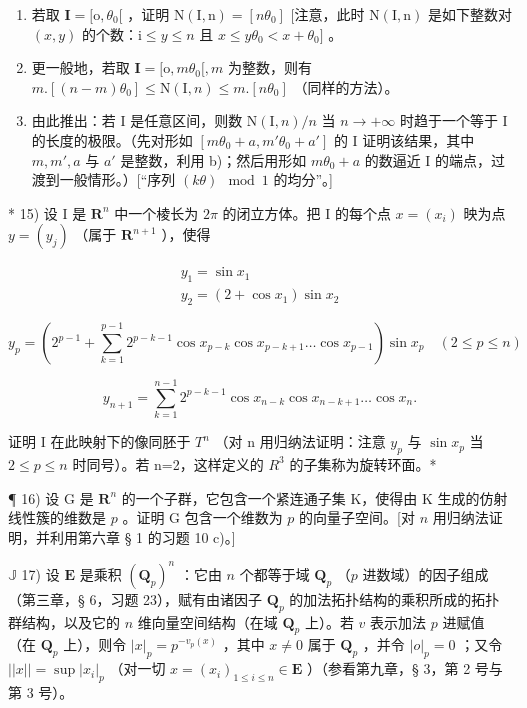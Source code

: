 \begin{enumerate}
\def\labelenumi{\alph{enumi})}
\item
  若取 \(\mathbf{I} = [\mathrm{o},\theta_0[\) ，证明 \(\mathrm{N(I,n)} = [n\theta_0]\) {[}注意，此时 \(\mathrm{N(I,n)}\) 是如下整数对 \((x,y)\) 的个数：\(\mathrm{i}\leqslant y\leqslant n\) 且 \(x\leqslant y\theta_0 < x + \theta_0]\) 。
\item
  更一般地，若取 \(\mathbf{I} = [\mathrm{o}, m\theta_0[, m\) 为整数，则有 \(m. [(n - m)\theta_0] \leqslant \mathrm{N}(\mathrm{I}, n) \leqslant m. [n\theta_0]\) （同样的方法）。
\item
  由此推出：若 I 是任意区间，则数 \(\mathrm{N}(\mathrm{I}, n)/n\) 当 \(n \to +\infty\) 时趋于一个等于 I 的长度的极限。（先对形如 \([m\theta_{0} + a, m'\theta_{0} + a']\) 的 I 证明该结果，其中 \(m, m', a\) 与 \(a'\) 是整数，利用 b)；然后用形如 \(m\theta_{0} + a\) 的数逼近 I 的端点，过渡到一般情形。）{[}“序列 \((k\theta) \mod 1\) 的均分”。{]}
\end{enumerate}

* 15) 设 I 是 \(\mathbf{R}^n\) 中一个棱长为 \(2\pi\) 的闭立方体。把 I 的每个点 \(x = (x_i)\) 映为点 \(y = (y_j)\) （属于 \(\mathbf{R}^{n+1}\) ），使得

\[
\begin{array}{l} y _ {1} = \sin x _ {1} \\ y _ {2} = (2 + \cos x _ {1}) \sin x _ {2} \end{array}
\]

\[
y _ {p} = \left(2 ^ {p - 1} + \sum_ {k = 1} ^ {p - 1} 2 ^ {p - k - 1} \cos x _ {p - k} \cos x _ {p - k + 1} \dots \cos x _ {p - 1}\right) \sin x _ {p} \quad (2 \leqslant p \leqslant n)
\]

\[
y _ {n + 1} = \sum_ {k = 1} ^ {n - 1} 2 ^ {p - k - 1} \cos x _ {n - k} \cos x _ {n - k + 1} \dots \cos x _ {n}.
\]

 证明 I 在此映射下的像同胚于 \(T^{n}\) （对 n 用归纳法证明：注意 \(y_{p}\) 与 \(\sin x_{p}\) 当 \(2 \leqslant p \leqslant n\) 时同号）。若 n=2，这样定义的 \(R^{3}\) 的子集称为旋转环面。*

¶ 16) 设 G 是 \(\mathbf{R}^n\) 的一个子群，它包含一个紧连通子集 K，使得由 K 生成的仿射线性簇的维数是 \(p\) 。证明 G 包含一个维数为 \(p\) 的向量子空间。{[}对 \(n\) 用归纳法证明，并利用第六章 § 1 的习题 10 c)。{]}

\(\mathbb{J}\) 17) 设 \(\mathbf{E}\) 是乘积 \((\mathbf{Q}_p)^n\) ：它由 \(n\) 个都等于域 \(\mathbf{Q}_p\) （\(p\) 进数域）的因子组成（第三章，§ 6，习题 23），赋有由诸因子 \(\mathbf{Q}_p\) 的加法拓扑结构的乘积所成的拓扑群结构，以及它的 \(n\) 维向量空间结构（在域 \(\mathbf{Q}_p\) 上）。若 \(v\) 表示加法 \(p\) 进赋值（在 \(\mathbf{Q}_p\) 上），则令 \(|x|_p = p^{-v_p(x)}\) ，其中 \(x \neq 0\) 属于 \(\mathbf{Q}_p\) ，并令 \(|o|_p = 0\) ；又令 \(||x|| = \sup |x_i|_p\) （对一切 \(x = (x_i)_{1 \leqslant i \leqslant n} \in \mathbf{E}\) ）（参看第九章，§ 3，第 2 号与第 3 号）。

